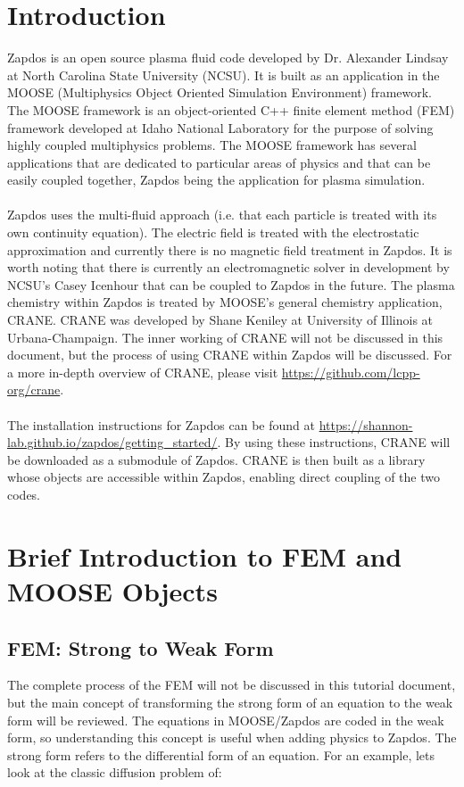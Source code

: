 \documentclass[final]{report}
\begin{document}
  \tableofcontents

  \chapter{Introduction} \label{introduction}
  Zapdos is an open source plasma fluid code developed by Dr. Alexander Lindsay at North Carolina State University (NCSU). It is built as an application in the MOOSE (Multiphysics Object Oriented Simulation Environment) framework. The MOOSE framework is an object-oriented C++ finite element method (FEM) framework developed at Idaho National Laboratory for the purpose of solving highly coupled multiphysics problems. The MOOSE framework has several applications that are dedicated to particular areas of physics and that can be easily coupled together, Zapdos being the application for plasma simulation. \\
  \\
  Zapdos uses the multi-fluid approach (i.e. that each particle is treated with its own continuity equation). The electric field is treated with the electrostatic approximation and currently there is no magnetic field treatment in Zapdos. It is worth noting that there is currently an electromagnetic solver in development by NCSU's Casey Icenhour that can be coupled to Zapdos in the future. The plasma chemistry within Zapdos is treated by MOOSE's general chemistry application, CRANE. CRANE was developed by Shane Keniley at University of Illinois at Urbana-Champaign. The inner working of CRANE will not be discussed in this document, but the process of using CRANE within Zapdos will be discussed. For a more in-depth overview of CRANE, please visit \url{https://github.com/lcpp-org/crane}.\\
  \\
  The installation instructions for Zapdos can be found at \url{https://shannon-lab.github.io/zapdos/getting_started/}. By using these instructions, CRANE will be downloaded as a submodule of Zapdos. CRANE is then built as a library whose objects are accessible within Zapdos, enabling direct coupling of the two codes.

  \chapter{Brief Introduction to FEM and MOOSE Objects} \label{chapter2}
  \section{FEM: Strong to Weak Form}
  The complete process of the FEM will not be discussed in this tutorial document, but the main concept of transforming the strong form of an equation to the weak form will be reviewed. The equations in MOOSE/Zapdos are coded in the weak form, so understanding this concept is useful when adding physics to Zapdos. The strong form refers to the differential form of an equation. For an example, lets look at the classic diffusion problem of:
\end{document}
